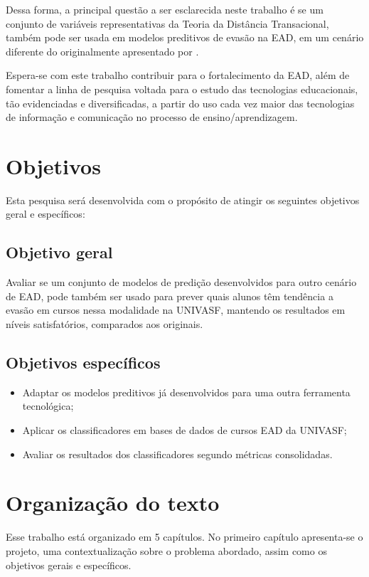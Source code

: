 Dessa forma, a principal questão a ser esclarecida neste trabalho é se um conjunto de variáveis
representativas da Teoria da Distância Transacional, também pode ser usada em modelos preditivos
de evasão na EAD, em um cenário diferente do originalmente apresentado por .

Espera-se com este trabalho contribuir para o fortalecimento da EAD, além de
fomentar a linha de pesquisa voltada para o estudo das tecnologias educacionais,
tão evidenciadas e diversificadas, a partir do uso cada vez maior das
tecnologias de informação e comunicação no processo de ensino/aprendizagem.

\section{Objetivos}

Esta pesquisa será desenvolvida com o propósito de atingir os seguintes
objetivos geral e específicos:

\subsection{Objetivo geral}

Avaliar se um conjunto de modelos de predição desenvolvidos para outro cenário
de EAD, pode também ser usado para prever quais alunos têm tendência a evasão em
cursos nessa modalidade na UNIVASF, mantendo os resultados em níveis
satisfatórios, comparados aos originais.

\subsection{Objetivos específicos}
\begin{itemize}
  \item Adaptar os modelos preditivos já desenvolvidos para uma outra ferramenta
  tecnológica;
  \item Aplicar os classificadores em bases de dados de cursos EAD da UNIVASF;
  \item Avaliar os resultados dos classificadores segundo métricas consolidadas.
\end{itemize}

\section{Organização do texto}

Esse trabalho está organizado em 5 capítulos. No primeiro capítulo apresenta-se
o projeto, uma contextualização sobre o problema abordado, assim como os
objetivos gerais e específicos.

